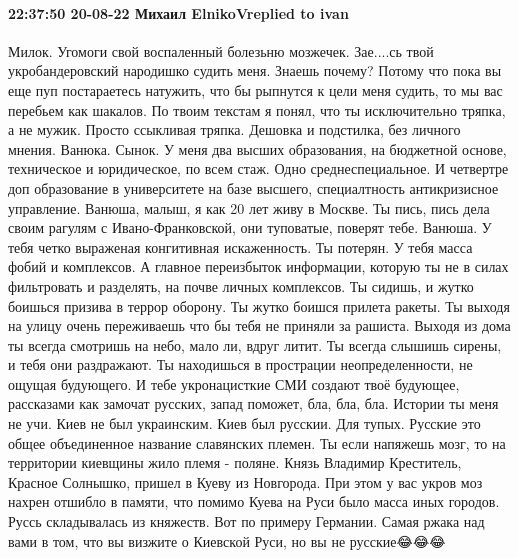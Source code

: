  
 
 
 
 

\paragraph{22:37:50 20-08-22 Михаил ElnikoVreplied to ivan}

Милок. Угомоги свой воспаленный болезьню мозжечек.
Зае....сь твой укробандеровский народишко судить меня. Знаешь почему?
Потому что пока вы еще пуп постараетесь натужить, что бы рыпнутся к цели меня судить, то мы вас перебьем как шакалов.
По твоим текстам я понял, что ты исключительно тряпка, а не мужик. Просто ссыкливая тряпка. Дешовка и подстилка, без личного мнения.
Ванюка. Сынок. У меня два высших образования, на бюджетной основе, техническое и юридическое, по всем стаж. Одно среднеспециальное. И четвертре доп образование в университете на базе высшего, специалтность антикризисное управление. Ванюша, малыш, я как 20 лет живу в Москве. Ты пись, пись дела своим рагулям с Ивано-Франковской, они туповатые, поверят тебе.
Ванюша. У тебя четко выраженая конгитивная искаженность. Ты потерян. У тебя масса фобий и комплексов. А главное переизбыток информации, которую ты не в силах фильтровать и разделять, на почве личных комплексов.
Ты сидишь, и жутко боишься призива в террор оборону. Ты жутко боишся прилета ракеты.
Ты выходя на улицу очень переживаешь что бы тебя не приняли за рашиста. Выходя из дома ты всегда смотришь на небо, мало ли, вдруг литит. Ты всегда слышишь сирены, и тебя они раздражают.
Ты находишься в прострации неопределенности, не ощущая будующего. И тебе укронацисткие СМИ создают твоё будующее, рассказами как замочат русских, запад поможет, бла, бла, бла.
Истории ты меня не учи. Киев не был украинским. Киев был русскии.
Для тупых. Русские это общее объединенное название славянских племен. Ты если напяжешь мозг, то на территории киевщины жило племя - поляне.
Князь Владимир Креститель, Красное Солнышко, пришел в Куеву из Новгорода.
При этом у вас укров моз нахрен отшибло в памяти, что помимо Куева на Руси было масса иных городов. Руссь складывалась из княжеств.
Вот по примеру Германии.
Самая ржака над вами в том, что вы визжите о Киевской Руси, но вы не русские😂😂😂
